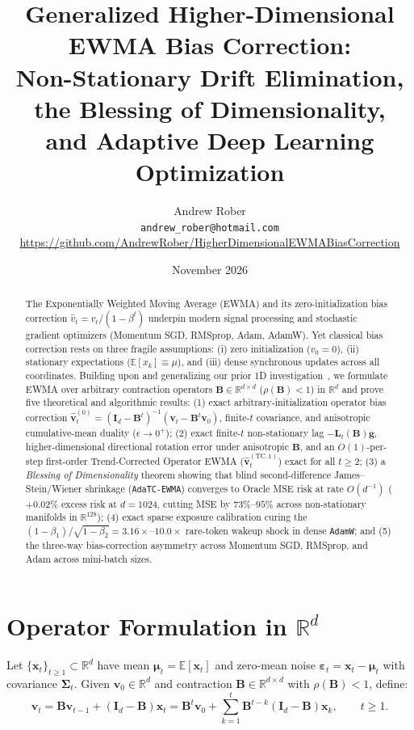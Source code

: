 \documentclass[11pt]{article}
\title{\textbf{Generalized Higher-Dimensional EWMA Bias Correction:\\
Non-Stationary Drift Elimination, the Blessing of Dimensionality,\\
and Adaptive Deep Learning Optimization}}
\author{Andrew Rober\\
\small \texttt{andrew\_rober@hotmail.com} \quad \url{https://github.com/AndrewRober/HigherDimensionalEWMABiasCorrection}}
\date{November 2026}
\begin{document}
\maketitle

\begin{abstract}
The Exponentially Weighted Moving Average (EWMA) and its zero-initialization bias correction $\hat{v}_t = v_t / (1 - \beta^t)$ underpin modern signal processing and stochastic gradient optimizers (Momentum SGD, RMSprop, Adam, AdamW). Yet classical bias correction rests on three fragile assumptions: (i) zero initialization ($v_0 = 0$), (ii) stationary expectations ($\mathbb{E}[x_k] \equiv \mu$), and (iii) dense synchronous updates across all coordinates. Building upon and generalizing our prior 1D investigation~\cite{rober2023ewma}, we formulate EWMA over arbitrary contraction operators $\mathbf{B} \in \mathbb{R}^{d \times d}$ ($\rho(\mathbf{B}) < 1$) in $\mathbb{R}^d$ and prove five theoretical and algorithmic results: (1) exact arbitrary-initialization operator bias correction $\hat{\mathbf{v}}_t^{(0)} = (\mathbf{I}_d - \mathbf{B}^t)^{-1}(\mathbf{v}_t - \mathbf{B}^t\mathbf{v}_0)$, finite-$t$ covariance, and anisotropic cumulative-mean duality ($\epsilon \to 0^+$); (2) exact finite-$t$ non-stationary lag $-\mathbf{L}_t(\mathbf{B})\mathbf{g}$, higher-dimensional directional rotation error under anisotropic $\mathbf{B}$, and an $O(1)$-per-step first-order Trend-Corrected Operator EWMA ($\hat{\mathbf{v}}_t^{(\mathrm{TC},1)}$) exact for all $t \ge 2$; (3) a \emph{Blessing of Dimensionality} theorem showing that blind second-difference James--Stein/Wiener shrinkage (\texttt{AdaTC-EWMA}) converges to Oracle MSE risk at rate $O(d^{-1})$ ($+0.02\%$ excess risk at $d = 1024$, cutting MSE by $73\%\text{--}95\%$ across non-stationary manifolds in $\mathbb{R}^{128}$); (4) exact sparse exposure calibration curing the $(1-\beta_1)/\sqrt{1-\beta_2} = 3.16\times\text{--}10.0\times$ rare-token wakeup shock in dense \texttt{AdamW}; and (5) the three-way bias-correction asymmetry across Momentum SGD, RMSprop, and Adam across mini-batch sizes.
\end{abstract}

\section{Operator Formulation in $\mathbb{R}^d$}
Let $\{\mathbf{x}_t\}_{t \ge 1} \subset \mathbb{R}^d$ have mean $\bm{\mu}_t = \mathbb{E}[\mathbf{x}_t]$ and zero-mean noise $\bm{\varepsilon}_t = \mathbf{x}_t - \bm{\mu}_t$ with covariance $\bm{\Sigma}_t$. Given $\mathbf{v}_0 \in \mathbb{R}^d$ and contraction $\mathbf{B} \in \mathbb{R}^{d \times d}$ with $\rho(\mathbf{B}) < 1$, define:
\begin{equation}
  \mathbf{v}_t = \mathbf{B}\mathbf{v}_{t-1} + (\mathbf{I}_d - \mathbf{B})\mathbf{x}_t
  = \mathbf{B}^t \mathbf{v}_0 + \sum_{k=1}^t \mathbf{B}^{t-k}(\mathbf{I}_d - \mathbf{B})\mathbf{x}_k, \qquad t \ge 1.
\end{equation}
\end{document}
